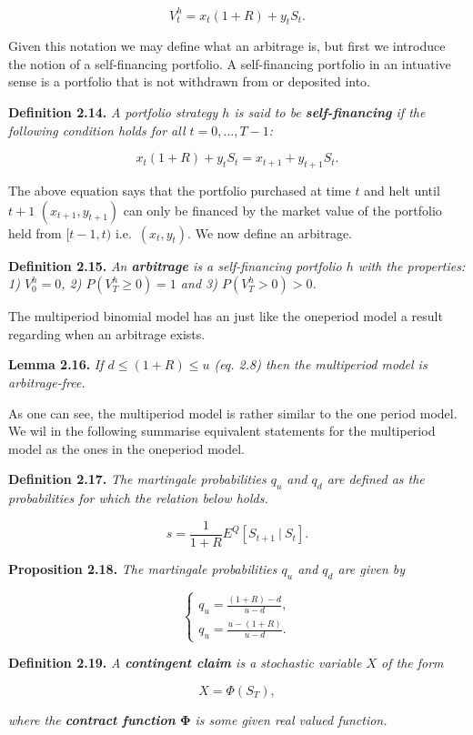 \documentclass[
]{article}
\begin{document}
\[
V_t^h=x_t(1+R)+y_tS_t.
\]

Given this notation we may define what an arbitrage is, but first we
introduce the notion of a self-financing portfolio. A self-financing
portfolio in an intuative sense is a portfolio that is not withdrawn
from or deposited into.

\textbf{Definition 2.14.} \emph{A portfolio strategy \(h\) is said to be
\textbf{self-financing} if the following condition holds for all
\(t=0,...,T-1\):}

\[
x_t(1+R)+y_tS_t=x_{t+1}+y_{t+1}S_t.
\]

The above equation says that the portfolio purchased at time \(t\) and
helt until \(t+1\) \((x_{t+1},y_{t+1})\) can only be financed by the
market value of the portfolio held from \([t-1,t)\)
i.e.~\((x_{t},y_{t})\). We now define an arbitrage.

\textbf{Definition 2.15.} \emph{An \textbf{arbitrage} is a
self-financing portfolio \(h\) with the properties: 1) \(V^h_0=0\), 2)
\(P(V^h_T\ge 0)=1\) and 3) \(P(V^h_T>0)>0\).}

The multiperiod binomial model has an just like the oneperiod model a
result regarding when an arbitrage exists.

\textbf{Lemma 2.16.} \emph{If \(d\le (1+R)\le u\) (eq. 2.8) then the
multiperiod model is arbitrage-free.}

As one can see, the multiperiod model is rather similar to the one
period model. We wil in the following summarise equivalent statements
for the multiperiod model as the ones in the oneperiod model.

\textbf{Definition 2.17.} \emph{The martingale probabilities \(q_u\) and
\(q_d\) are defined as the probabilities for which the relation below
holds.}

\[
s=\frac{1}{1+R}E^Q[S_{t+1}\ \vert\ S_t].
\]

\textbf{Proposition 2.18.} \emph{The martingale probabilities \(q_u\)
and \(q_d\) are given by}

\[
\left\{\begin{matrix}q_u=\frac{(1+R)-d}{u-d},\\ q_u=\frac{u-(1+R)}{u-d}.\end{matrix}\right.
\]

\textbf{Definition 2.19.} \emph{A \textbf{contingent claim} is a
stochastic variable \(X\) of the form}

\[
X=\Phi(S_T),
\]

\emph{where the \textbf{contract function} \(\mathbf{\Phi}\) is some
given real valued function.}
\end{document}
